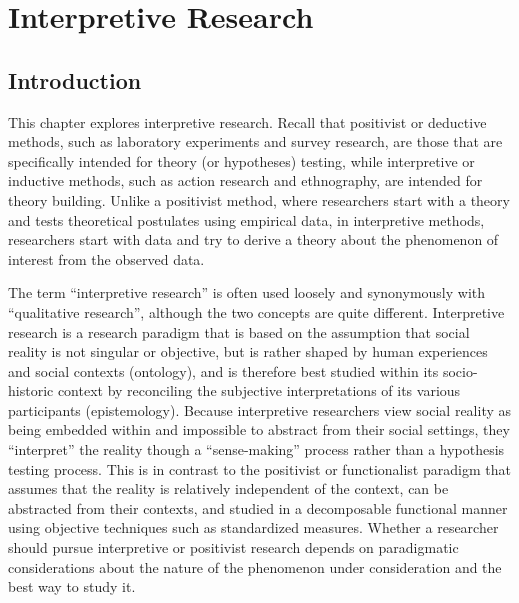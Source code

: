 \chapter{Interpretive Research}\label{ch13:interpretive_research}

\section{Introduction}

This chapter explores interpretive research. Recall that positivist or deductive methods, such as laboratory experiments and survey research, are those that are specifically intended for theory (or hypotheses) testing, while interpretive or inductive methods, such as action research and ethnography, are intended for theory building. Unlike a positivist method, where researchers start with a theory and tests theoretical postulates using empirical data, in interpretive methods, researchers start with data and try to derive a theory about the phenomenon of interest from the observed data.

The term ``interpretive research'' is often used loosely and synonymously with ``qualitative research'', although the two concepts are quite different. Interpretive research is a research paradigm that is based on the assumption that social reality is not singular or objective, but is rather shaped by human experiences and social contexts (ontology), and is therefore best studied within its socio-historic context by reconciling the subjective interpretations of its various participants (epistemology). Because interpretive researchers view social reality as being embedded within and impossible to abstract from their social settings, they ``interpret'' the reality though a ``sense-making'' process rather than a hypothesis testing process. This is in contrast to the positivist or functionalist paradigm that assumes that the reality is relatively independent of the context, can be abstracted from their contexts, and studied in a decomposable functional manner using objective techniques such as standardized measures. Whether a researcher should pursue interpretive or positivist research depends on paradigmatic considerations about the nature of the phenomenon under consideration and the best way to study it.

